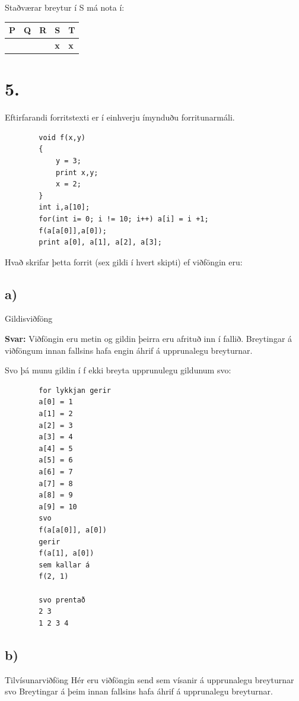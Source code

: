 \documentclass{article}
\newcommand{\sv}{\textbf{Svar:}}
\newcommand{\bo}[1]{\textbf{#1}}
\begin{document}
     Staðværar breytur í S má nota í:

     
     \begin{tabularx}{\textwidth}{ |X|X|X|X|X|}
        \hline
        \textbf{P}  & \textbf{Q}  & \textbf{R}  & \textbf{S}  & \textbf{T} \\ \hline
         & & & \bo{x} & \bo{x} \\ \hline
     \end{tabularx}


     \newpage

     \section{5.}
     Eftirfarandi forritstexti er í einhverju ímynduðu forritunarmáli.
     \begin{verbatim}
        void f(x,y)
        {
            y = 3;
            print x,y;
            x = 2;
        }
        int i,a[10];
        for(int i= 0; i != 10; i++) a[i] = i +1;
        f(a[a[0]],a[0]);
        print a[0], a[1], a[2], a[3];
     \end{verbatim}

     Hvað skrifar þetta forrit (sex gildi í hvert skipti) ef viðföngin eru:

     \subsection{a)} Gildisviðföng 

    \sv 
    Viðföngin eru metin og gildin þeirra eru afrituð inn í fallið. Breytingar á viðföngum innan fallsins hafa engin áhrif á upprunalegu breyturnar.

    Svo þá munu gildin í f ekki breyta upprunulegu gildunum svo:
    \begin{verbatim}
        for lykkjan gerir
        a[0] = 1
        a[1] = 2
        a[2] = 3
        a[3] = 4
        a[4] = 5
        a[5] = 6
        a[6] = 7
        a[7] = 8
        a[8] = 9
        a[9] = 10
        svo 
        f(a[a[0]], a[0])
        gerir
        f(a[1], a[0])
        sem kallar á
        f(2, 1)

        svo prentað
        2 3
        1 2 3 4
    \end{verbatim}


     \subsection{b)} Tilvísunarviðföng
     Hér eru viðföngin send sem vísanir á upprunalegu breyturnar svo Breytingar
     á þeim innan fallsins hafa áhrif á upprunalegu breyturnar.
\end{document}
